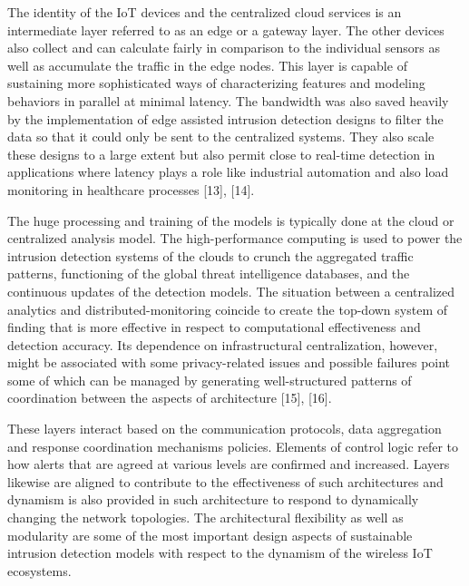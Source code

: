 \documentclass[12pt]{article}
\begin{document}
The identity of the IoT devices and the centralized cloud services is an intermediate layer referred to as an edge or a gateway layer. The other devices also collect and can calculate fairly in comparison to the individual sensors as well as accumulate the traffic in the edge nodes. This layer is capable of sustaining more sophisticated ways of characterizing features and modeling behaviors in parallel at minimal latency. The bandwidth was also saved heavily by the implementation of edge assisted intrusion detection designs to filter the data so that it could only be sent to the centralized systems. They also scale these designs to a large extent but also permit close to real-time detection in applications where latency plays a role like industrial automation and also load monitoring in healthcare processes [13], [14].















The huge processing and training of the models is typically done at the cloud or centralized analysis model. The high-performance computing is used to power the intrusion detection systems of the clouds to crunch the aggregated traffic patterns, functioning of the global threat intelligence databases, and the continuous updates of the detection models. The situation between a centralized analytics and distributed-monitoring coincide to create the top-down system of finding that is more effective in respect to computational effectiveness and detection accuracy. Its dependence on infrastructural centralization, however, might be associated with some privacy-related issues and possible failures point some of which can be managed by generating well-structured patterns of coordination between the aspects of architecture [15], [16].















These layers interact based on the communication protocols, data aggregation and response coordination mechanisms policies. Elements of control logic refer to how alerts that are agreed at various levels are confirmed and increased. Layers likewise are aligned to contribute to the effectiveness of such architectures and dynamism is also provided in such architecture to respond to dynamically changing the network topologies. The architectural flexibility as well as modularity are some of the most important design aspects of sustainable intrusion detection models with respect to the dynamism of the wireless IoT ecosystems.
\end{document}
